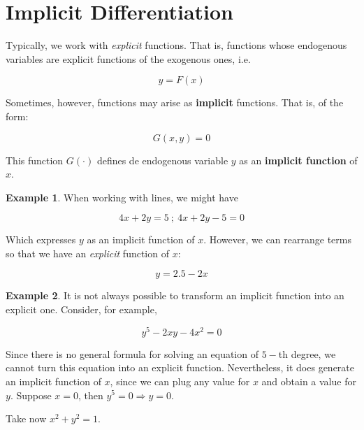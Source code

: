 \documentclass[11pt]{article}
\theoremstyle{definition}
\newtheorem{example}{Example}
\theoremstyle{plain}
\begin{document}
\section{Implicit Differentiation}\label{implicit-differentiation}

Typically, we work with \emph{explicit} functions. That is, functions
whose endogenous variables are explicit functions of the exogenous ones,
i.e.

\[
y = F(x)
\]

Sometimes, however, functions may arise as \textbf{implicit} functions.
That is, of the form:

\[
G(x, y) = 0
\]

This function \(G(\cdot)\) defines de endogenous variable \(y\) as an
\textbf{implicit function} of \(x\).

\begin{example}
When working with lines, we might have

\[
4x + 2y = 5 \ ; \ 4x + 2y - 5 = 0
\]

Which expresses \(y\) as an implicit function of \(x\). However, we can
rearrange terms so that we have an \emph{explicit} function of \(x\):

\[
y = 2.5 - 2x 
\]
\end{example}

\begin{example}
It is not always possible to transform an implicit
function into an explicit one. Consider, for example,

\[
y^5 - 2xy - 4x^2 = 0
\]

Since there is no general formula for solving an equation of \(5-\)th
degree, we cannot turn this equation into an explicit function.
Nevertheless, it does generate an implicit function of \(x\), since we
can plug any value for \(x\) and obtain a value for \(y\). Suppose
\(x = 0\), then \(y^5 = 0 \Rightarrow y = 0\).
\end{example}

Take now \(x^2 + y^2 = 1\).
\end{document}
